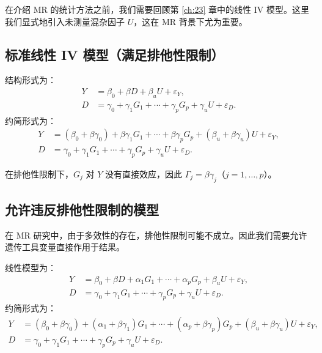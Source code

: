 在介绍 MR 的统计方法之前，我们需要回顾第 \ref{ch:23} 章中的线性 IV 模型。这里我们显式地引入未测量混杂因子 $U$，这在 MR 背景下尤为重要。

\subsection{标准线性 IV 模型（满足排他性限制）}\label{sec:25-valid-iv}

\begin{Definition}[标准线性 IV 模型]\label{def:25-linear-iv-valid}
结构形式为：
\begin{align}
Y &= \beta_0 + \beta D + \beta_u U + \varepsilon_Y, \tag{25.1} \\
D &= \gamma_0 + \gamma_1 G_1 + \cdots + \gamma_p G_p + \gamma_u U + \varepsilon_D. \tag{25.2}
\end{align}
约简形式为：
\begin{align}
Y &= (\beta_0 + \beta\gamma_0) + \beta\gamma_1 G_1 + \cdots + \beta\gamma_p G_p + (\beta_u + \beta\gamma_u)U + \varepsilon_Y, \tag{25.3} \\
D &= \gamma_0 + \gamma_1 G_1 + \cdots + \gamma_p G_p + \gamma_u U + \varepsilon_D. \tag{25.4}
\end{align}
\end{Definition}

在排他性限制下，$G_j$ 对 $Y$ 没有直接效应，因此 $\Gamma_j = \beta\gamma_j$（$j = 1, \dots, p$）。

\subsection{允许违反排他性限制的模型}\label{sec:25-invalid-iv}

在 MR 研究中，由于多效性的存在，排他性限制可能不成立。因此我们需要允许遗传工具变量直接作用于结果。

\begin{Definition}[可能无效的工具变量模型]\label{def:25-linear-iv-invalid}
线性模型为：
\begin{align}
Y &= \beta_0 + \beta D + \alpha_1 G_1 + \cdots + \alpha_p G_p + \beta_u U + \varepsilon_Y, \tag{25.5} \\
D &= \gamma_0 + \gamma_1 G_1 + \cdots + \gamma_p G_p + \gamma_u U + \varepsilon_D. \tag{25.6}
\end{align}
约简形式为：
\begin{align}
Y &= (\beta_0 + \beta\gamma_0) + (\alpha_1 + \beta\gamma_1)G_1 + \cdots + (\alpha_p + \beta\gamma_p)G_p + (\beta_u + \beta\gamma_u)U + \varepsilon_Y, \tag{25.7} \\
D &= \gamma_0 + \gamma_1 G_1 + \cdots + \gamma_p G_p + \gamma_u U + \varepsilon_D. \tag{25.8}
\end{align}
\end{Definition}

